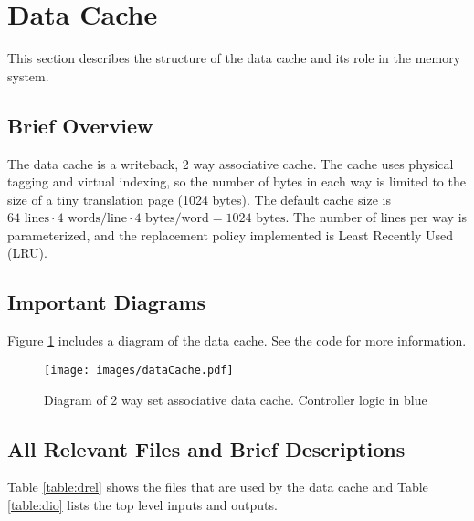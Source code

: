\section{Data Cache}
This section describes the structure of the data cache and its role in the memory system.

\subsection{Brief Overview}

The data cache is a writeback, 2 way associative cache. 
The cache uses physical tagging and virtual indexing, so the number of bytes in each way is limited to the size of a tiny translation page (1024 bytes). 
The default cache size is $64 \text{ lines} \cdot 4 \text{ words/line} \cdot 4 \text{ bytes/word} = 1024 \text{ bytes}$. 
The number of lines per way is parameterized, and the replacement policy implemented is Least Recently Used (LRU).

\subsection{Important Diagrams}

	Figure \ref{fig:dcachediag} includes a diagram of the data cache.
	See the code for more information.
	\begin{figure}
	\label{fig:dcachediag}
	\centering
	\texttt{[image: images/dataCache.pdf]}
	\caption{Diagram of 2 way set associative data cache. Controller logic in blue}
	\end{figure}

\subsection{All Relevant Files and Brief Descriptions}

	Table \ref{table:drel} shows the files that are used by the data cache and Table \ref{table:dio} lists the top level inputs and outputs.

